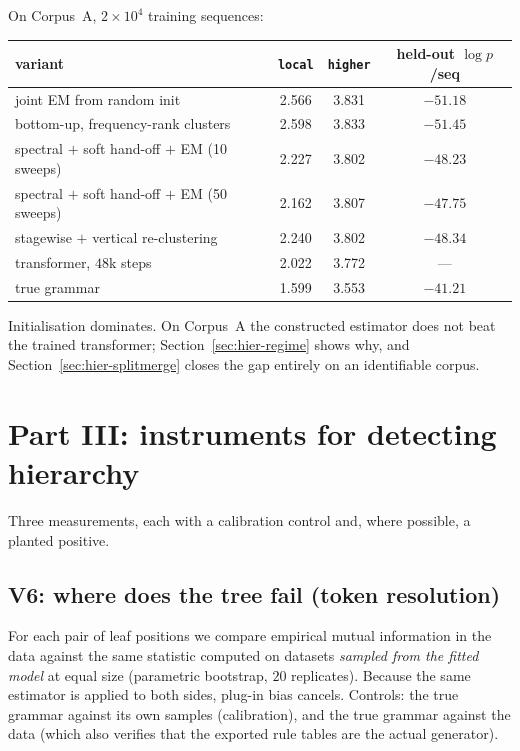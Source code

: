 \documentclass[11pt,a4paper]{article}
\theoremstyle{plain}
\theoremstyle{definition}
\begin{document}
On Corpus~A, $2\times10^4$ training sequences:

\begin{center}
\begin{tabular}{lccc}
\toprule
variant & \texttt{local} & \texttt{higher} & held-out $\log p$/seq \\
\midrule
joint EM from random init      & 2.566 & 3.831 & $-51.18$ \\
bottom-up, frequency-rank clusters & 2.598 & 3.833 & $-51.45$ \\
spectral $+$ soft hand-off $+$ EM (10 sweeps) & 2.227 & 3.802 & $-48.23$ \\
spectral $+$ soft hand-off $+$ EM (50 sweeps) & 2.162 & 3.807 & $-47.75$ \\
stagewise $+$ vertical re-clustering & 2.240 & 3.802 & $-48.34$ \\
\midrule
transformer, $48$k steps        & 2.022 & 3.772 & --- \\
true grammar                    & 1.599 & 3.553 & $-41.21$ \\
\bottomrule
\end{tabular}
\end{center}

\noindent
Initialisation dominates. On Corpus~A the constructed estimator does not beat
the trained transformer; Section~\ref{sec:hier-regime} shows why, and
Section~\ref{sec:hier-splitmerge} closes the gap entirely on an identifiable
corpus.

\section{Part III: instruments for detecting hierarchy}
\label{sec:hier-instruments}

Three measurements, each with a calibration control and, where possible, a
planted positive.

\subsection{V6: where does the tree fail (token resolution)}

For each pair of leaf positions we compare empirical mutual information in the
data against the same statistic computed on datasets \emph{sampled from the
fitted model} at equal size (parametric bootstrap, $20$ replicates). Because
the same estimator is applied to both sides, plug-in bias cancels. Controls:
the true grammar against its own samples (calibration), and the true grammar
against the data (which also verifies that the exported rule tables are the
actual generator).
\end{document}
